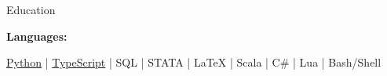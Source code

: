 \documentclass{resume/resume}
\begin{document}
\begin{rSection}{Education}
\begin{adjustwidth}{6em}{0pt}
\end{adjustwidth}

\end{rSection}

%
%   
%
%
%
\vspace{-0.4em}
{\bf Languages:}
\vspace{-1.83em}
\begin{adjustwidth}{6em}{0pt}
  \href{https://github.com/search?q=user\%3ASpelkington+user\%3AUtahTriangle+extension\%3Apy+extension\%3Aipynb&type=Code&ref=advsearch&l=&l=}{Python} |
  \href{https://github.com/search?p=1&q=user\%3ASpelkington+extension\%3Ats+extension\%3Atsx&type=Code}{TypeScript} | 
  SQL |
  STATA |
  LaTeX |
  Scala |
  C\# |
  Lua | 
  Bash/Shell
\end{adjustwidth}
\end{document}
